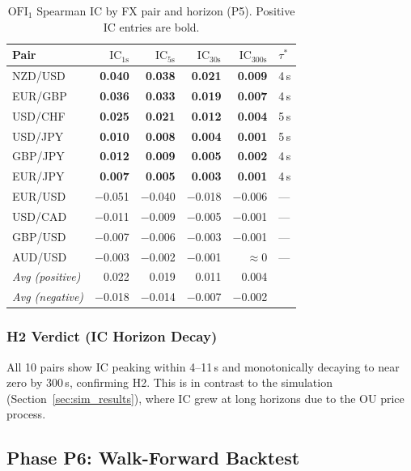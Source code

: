 \documentclass[12pt,a4paper]{article}
\theoremstyle{definition}
\theoremstyle{remark}
\newcommand{\IC}{\mathrm{IC}}
\newcommand{\OFI}{\mathrm{OFI}}
\begin{document}
\begin{table}[H]
\centering
\caption{$\OFI_1$ Spearman IC by FX pair and horizon (P5).
  Positive IC entries are bold.}
\label{tab:p5IC}
\small
\begin{tabular}{lrrrrl}
\toprule
\textbf{Pair} & $\IC_{1\text{s}}$ & $\IC_{5\text{s}}$
  & $\IC_{30\text{s}}$ & $\IC_{300\text{s}}$ & $\tau^*$ \\
\midrule
NZD/USD  & \textbf{0.040} & \textbf{0.038} & \textbf{0.021} & \textbf{0.009} & 4\,s \\
EUR/GBP  & \textbf{0.036} & \textbf{0.033} & \textbf{0.019} & \textbf{0.007} & 4\,s \\
USD/CHF  & \textbf{0.025} & \textbf{0.021} & \textbf{0.012} & \textbf{0.004} & 5\,s \\
USD/JPY  & \textbf{0.010} & \textbf{0.008} & \textbf{0.004} & \textbf{0.001} & 5\,s \\
GBP/JPY  & \textbf{0.012} & \textbf{0.009} & \textbf{0.005} & \textbf{0.002} & 4\,s \\
EUR/JPY  & \textbf{0.007} & \textbf{0.005} & \textbf{0.003} & \textbf{0.001} & 4\,s \\
\midrule
EUR/USD  & $-$0.051 & $-$0.040 & $-$0.018 & $-$0.006 & --- \\
USD/CAD  & $-$0.011 & $-$0.009 & $-$0.005 & $-$0.001 & --- \\
GBP/USD  & $-$0.007 & $-$0.006 & $-$0.003 & $-$0.001 & --- \\
AUD/USD  & $-$0.003 & $-$0.002 & $-$0.001 & $\approx$0 & --- \\
\midrule
\textit{Avg (positive)} & 0.022 & 0.019 & 0.011 & 0.004 & \\
\textit{Avg (negative)} & $-$0.018 & $-$0.014 & $-$0.007 & $-$0.002 & \\
\bottomrule
\end{tabular}
\end{table}

\subsubsection{H2 Verdict (IC Horizon Decay)}

All 10 pairs show IC peaking within 4--11\,s and monotonically decaying
to near zero by 300\,s, confirming H2. This is in contrast to the
simulation (Section~\ref{sec:sim_results}), where IC grew at long
horizons due to the OU price process.

\subsection{Phase P6: Walk-Forward Backtest}
\label{sec:backtest_results}
\end{document}
